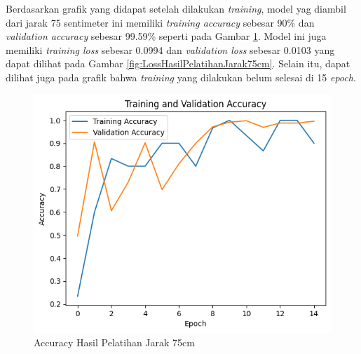 Berdasarkan grafik yang didapat setelah dilakukan \emph{training}, model yag diambil dari jarak 75 sentimeter ini memiliki \emph{training accuracy} sebesar 90\% dan \emph{validation accuracy} sebesar 99.59\% seperti pada Gambar \ref{fig:AccuracyHasilPelatihanJarak75cm}. Model ini juga memiliki \emph{training loss} sebesar 0.0994 dan \emph{validation loss} sebesar 0.0103 yang dapat dilihat pada Gambar \ref{fig:LossHasilPelatihanJarak75cm}. Selain itu, dapat dilihat juga pada grafik bahwa \emph{training} yang dilakukan belum selesai di 15 \emph{epoch}.  

\begin{figure} [H] \centering
  \includegraphics[scale=0.7]{gambar/75accuracy.png}
  \caption{Accuracy Hasil Pelatihan Jarak 75cm}
  \label{fig:AccuracyHasilPelatihanJarak75cm}
\end{figure}


